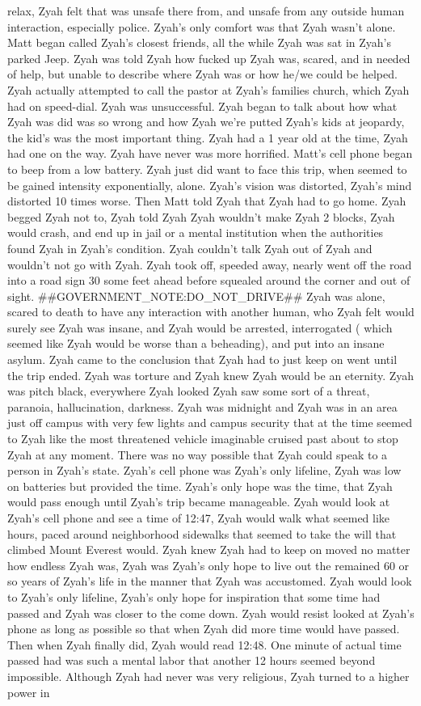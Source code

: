 \documentclass[12pt]{book}
\begin{document}
relax, Zyah felt that was unsafe there from, and unsafe from any outside human interaction, especially police. Zyah's only comfort was that Zyah wasn't alone. Matt began called Zyah's closest friends, all the while Zyah was sat in Zyah's parked Jeep. Zyah was told Zyah how fucked up Zyah was, scared, and in needed of help, but unable to describe where Zyah was or how he/we could be helped. Zyah actually attempted to call the pastor at Zyah's families church, which Zyah had on speed-dial. Zyah was unsuccessful. Zyah began to talk about how what Zyah was did was so wrong and how Zyah we're putted Zyah's kids at jeopardy, the kid's was the most important thing. Zyah had a 1 year old at the time, Zyah had one on the way. Zyah have never was more horrified. Matt's cell phone began to beep from a low battery. Zyah just did want to face this trip, when seemed to be gained intensity exponentially, alone. Zyah's vision was distorted, Zyah's mind distorted 10 times worse. Then Matt told Zyah that Zyah had to go home. Zyah begged Zyah not to, Zyah told Zyah Zyah wouldn't make Zyah 2 blocks, Zyah would crash, and end up in jail or a mental institution when the authorities found Zyah in Zyah's condition. Zyah couldn't talk Zyah out of Zyah and wouldn't not go with Zyah. Zyah took off, speeded away, nearly went off the road into a road sign 30 some feet ahead before squealed around the corner and out of sight. \#\#GOVERNMENT\_NOTE:DO\_NOT\_DRIVE\#\# Zyah was alone, scared to death to have any interaction with another human, who Zyah felt would surely see Zyah was insane, and Zyah would be arrested, interrogated ( which seemed like Zyah would be worse than a beheading), and put into an insane asylum. Zyah came to the conclusion that Zyah had to just keep on went until the trip ended. Zyah was torture and Zyah knew Zyah would be an eternity. Zyah was pitch black, everywhere Zyah looked Zyah saw some sort of a threat, paranoia, hallucination, darkness. Zyah was midnight and Zyah was in an area just off campus with very few lights and campus security that at the time seemed to Zyah like the most threatened vehicle imaginable cruised past about to stop Zyah at any moment. There was no way possible that Zyah could speak to a person in Zyah's state. Zyah's cell phone was Zyah's only lifeline, Zyah was low on batteries but provided the time. Zyah's only hope was the time, that Zyah would pass enough until Zyah's trip became manageable. Zyah would look at Zyah's cell phone and see a time of 12:47, Zyah would walk what seemed like hours, paced around neighborhood sidewalks that seemed to take the will that climbed Mount Everest would. Zyah knew Zyah had to keep on moved no matter how endless Zyah was, Zyah was Zyah's only hope to live out the remained 60 or so years of Zyah's life in the manner that Zyah was accustomed. Zyah would look to Zyah's only lifeline, Zyah's only hope for inspiration that some time had passed and Zyah was closer to the come down. Zyah would resist looked at Zyah's phone as long as possible so that when Zyah did more time would have passed. Then when Zyah finally did, Zyah would read 12:48. One minute of actual time passed had was such a mental labor that another 12 hours seemed beyond impossible. Although Zyah had never was very religious, Zyah turned to a higher power in 
\end{document}
